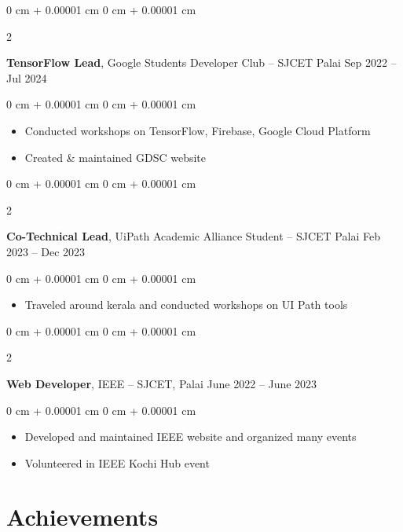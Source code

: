 \documentclass[10pt, letterpaper]{article}
\newenvironment{highlights}{
    \begin{itemize}[
        topsep=0.10 cm,
        parsep=0.10 cm,
        partopsep=0pt,
        itemsep=0pt,
        leftmargin=0 cm + 10pt
    ]
}{
    \end{itemize}
} %
\newenvironment{onecolentry}{
    \begin{adjustwidth}{
        0 cm + 0.00001 cm
    }{
        0 cm + 0.00001 cm
    }
}{
    \end{adjustwidth}
} %
\newenvironment{twocolentry}[2][]{
    \onecolentry
    \def\secondColumn{#2}
    \setcolumnwidth{\fill, 4.5 cm}
    \begin{paracol}{2}
}{
    \switchcolumn \raggedleft \secondColumn
    \end{paracol}
    \endonecolentry
} %
\begin{document}
\vspace{0.2 cm}

\begin{twocolentry}{
		Sep 2022 – Jul 2024
	}
	\textbf{TensorFlow Lead}, Google Students Developer Club -- SJCET Palai\end{twocolentry}

\vspace{0.10 cm}
\begin{onecolentry}
	\begin{highlights}
		\item Conducted workshops on TensorFlow, Firebase, Google Cloud Platform
		\item Created \& maintained GDSC website
	\end{highlights}
\end{onecolentry}

\vspace{0.2 cm}

\begin{twocolentry}{
		Feb 2023 – Dec 2023
	}
	\textbf{Co-Technical Lead}, UiPath Academic Alliance Student -- SJCET Palai\end{twocolentry}

\vspace{0.10 cm}
\begin{onecolentry}
	\begin{highlights}
		\item Traveled around kerala and conducted workshops on UI Path tools
	\end{highlights}
\end{onecolentry}

\vspace{0.2 cm}

\begin{twocolentry}{
		June 2022 – June 2023
	}
	\textbf{Web Developer}, IEEE -- SJCET, Palai\end{twocolentry}

\vspace{0.10 cm}
\begin{onecolentry}
	\begin{highlights}
		\item Developed and maintained IEEE website and organized many events
		\item Volunteered in IEEE Kochi Hub event
	\end{highlights}
\end{onecolentry}

\section{Achievements}
\end{document}
